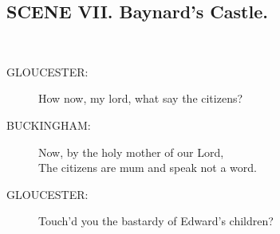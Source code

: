 \documentclass{article}
\begin{document}
\subsection*{SCENE VII.  Baynard's Castle.}
\\
\begin{description}
\item[GLOUCESTER:] 
\hspace{1pt}How now, my lord, what say the citizens?\\
\end{description}
\begin{description}
\item[BUCKINGHAM:] 
\hspace{1pt}Now, by the holy mother of our Lord,\\
\hspace{1pt}The citizens are mum and speak not a word.\\
\end{description}
\begin{description}
\item[GLOUCESTER:] 
\hspace{1pt}Touch'd you the bastardy of Edward's children?\\
\end{description}
\end{document}
